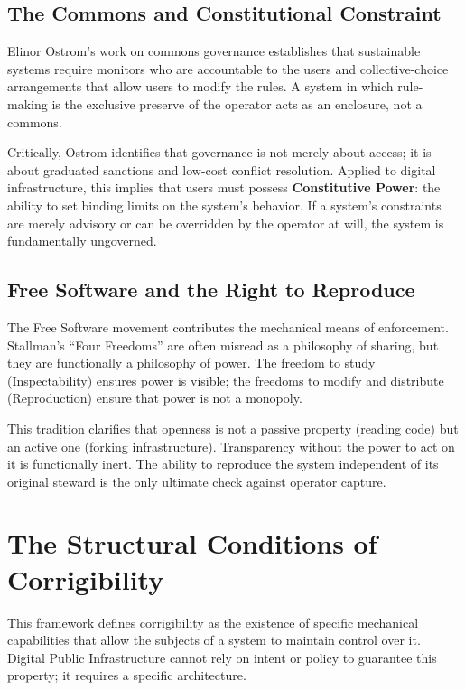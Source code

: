 \documentclass{article}
\begin{document}
\subsection{The Commons and Constitutional Constraint}

Elinor Ostrom's work on commons governance \citep{ostrom1990} establishes that sustainable systems require monitors who are accountable to the users and collective-choice arrangements that allow users to modify the rules. A system in which rule-making is the exclusive preserve of the operator acts as an enclosure, not a commons.

Critically, Ostrom identifies that governance is not merely about access; it is about graduated sanctions and low-cost conflict resolution. Applied to digital infrastructure, this implies that users must possess \textbf{Constitutive Power}: the ability to set binding limits on the system's behavior. If a system's constraints are merely advisory or can be overridden by the operator at will, the system is fundamentally ungoverned.

\subsection{Free Software and the Right to Reproduce}

The Free Software movement \citep{stallman2002} contributes the mechanical means of enforcement. Stallman's ``Four Freedoms'' are often misread as a philosophy of sharing, but they are functionally a philosophy of power. The freedom to study (Inspectability) ensures power is visible; the freedoms to modify and distribute (Reproduction) ensure that power is not a monopoly.

This tradition clarifies that openness is not a passive property (reading code) but an active one (forking infrastructure). Transparency without the power to act on it is functionally inert. The ability to reproduce the system independent of its original steward is the only ultimate check against operator capture.

\section{The Structural Conditions of Corrigibility}
\label{sec:tests}

This framework defines corrigibility as the existence of specific mechanical capabilities that allow the subjects of a system to maintain control over it. Digital Public Infrastructure cannot rely on intent or policy to guarantee this property; it requires a specific architecture.
\end{document}
